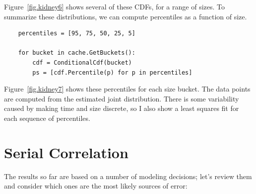 \documentclass[12pt]{book}
\begin{document}
Figure~\ref{fig.kidney6} shows several of these CDFs, for
a range of sizes.  To summarize these distributions, we can
compute percentiles as a function of size.

\begin{verbatim}
    percentiles = [95, 75, 50, 25, 5]

    for bucket in cache.GetBuckets():
        cdf = ConditionalCdf(bucket)      
        ps = [cdf.Percentile(p) for p in percentiles]
\end{verbatim}

Figure~\ref{fig.kidney7} shows these percentiles for each
size bucket.  The data points are computed from the estimated
joint distribution.  There is some variability caused by making
time and size discrete, so I also show a least squares fit for
each sequence of percentiles.


%


\section{Serial Correlation}

The results so far are based on a number of modeling decisions;
let's review them and consider which ones are the most
likely sources of error:
\end{document}
